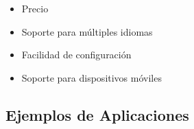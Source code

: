 \begin{itemize}
    \item Precio
    \item Soporte para m\'ultiples idiomas
    \item Facilidad de configuraci\'on
    \item Soporte para dispositivos m\'oviles
\end{itemize}

\subsection{Ejemplos de Aplicaciones}





